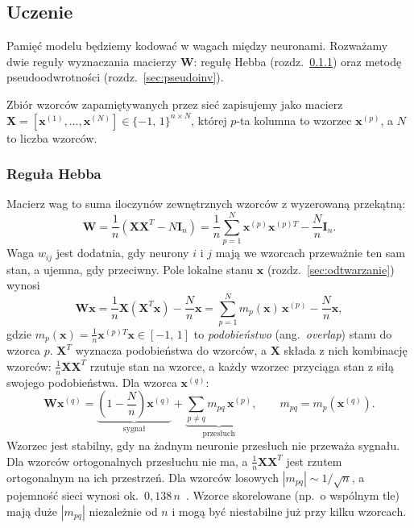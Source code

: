 \documentclass{article}
\begin{document}
\subsection{Uczenie}
Pamięć modelu będziemy kodować w wagach między neuronami.
Rozważamy dwie reguły wyznaczania macierzy $\mathbf{W}$: regułę Hebba (rozdz.~\ref{sec:hebb}) oraz metodę pseudoodwrotności (rozdz.~\ref{sec:pseudoinv}).

Zbiór wzorców zapamiętywanych przez sieć zapisujemy jako macierz
$\mathbf{X} = \left[\mathbf{x}^{(1)}, \ldots, \mathbf{x}^{(N)}\right] \in \{-1,\, 1\}^{n \times N}$,
której $p$-ta kolumna to wzorzec $\mathbf{x}^{(p)}$, a $N$ to liczba wzorców.

\subsubsection{Reguła Hebba}
\label{sec:hebb}
Macierz wag to suma iloczynów zewnętrznych wzorców z wyzerowaną przekątną:
\[
  \mathbf{W} = \frac{1}{n}\left(\mathbf{X}\mathbf{X}^{T} - N\mathbf{I}_{n}\right)
             = \frac{1}{n}\sum_{p=1}^{N} \mathbf{x}^{(p)}\mathbf{x}^{(p)T} - \frac{N}{n}\mathbf{I}_{n}.
\]
Waga $w_{ij}$ jest dodatnia, gdy neurony $i$ i $j$ mają we wzorcach przeważnie ten sam stan, a ujemna, gdy przeciwny.
Pole lokalne stanu $\mathbf{x}$ (rozdz.~\ref{sec:odtwarzanie}) wynosi
\[
  \mathbf{W}\mathbf{x} = \frac{1}{n}\mathbf{X}\left(\mathbf{X}^{T}\mathbf{x}\right) - \frac{N}{n}\mathbf{x}
                       = \sum_{p=1}^{N} m_p(\mathbf{x})\, \mathbf{x}^{(p)} - \frac{N}{n}\mathbf{x},
\]
gdzie $m_p(\mathbf{x}) = \frac{1}{n}\mathbf{x}^{(p)T}\mathbf{x} \in [-1,\, 1]$ to \emph{podobieństwo} (ang.\ \emph{overlap}) stanu do wzorca $p$.
$\mathbf{X}^{T}$ wyznacza podobieństwa do wzorców, a $\mathbf{X}$ składa z nich kombinację wzorców:
$\frac{1}{n}\mathbf{X}\mathbf{X}^{T}$ rzutuje stan na wzorce, a każdy wzorzec przyciąga stan z siłą swojego podobieństwa.
Dla wzorca $\mathbf{x}^{(q)}$:
\[
  \mathbf{W}\mathbf{x}^{(q)} = \underbrace{\left(1 - \frac{N}{n}\right)\mathbf{x}^{(q)}}_{\text{sygnał}}
                             + \underbrace{\sum_{p \neq q} m_{pq}\, \mathbf{x}^{(p)}}_{\text{przesłuch}},
  \qquad m_{pq} = m_p(\mathbf{x}^{(q)}).
\]
Wzorzec jest stabilny, gdy na żadnym neuronie przesłuch nie przeważa sygnału.
Dla wzorców ortogonalnych przesłuchu nie ma, a $\frac{1}{n}\mathbf{X}\mathbf{X}^{T}$ jest rzutem ortogonalnym na ich przestrzeń.
Dla wzorców losowych $|m_{pq}| \sim 1/\sqrt{n}$, a pojemność sieci wynosi ok.\ $0{,}138\,n$~\cite{amit1985}.
Wzorce skorelowane (np.\ o wspólnym tle) mają duże $|m_{pq}|$ niezależnie od $n$
i mogą być niestabilne już przy kilku wzorcach.
\end{document}
